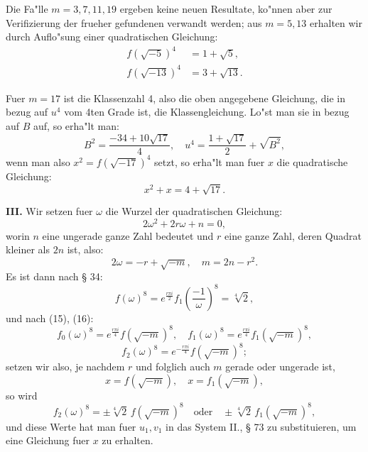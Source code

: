 \documentclass[12pt,a4paper]{article}
\theoremstyle{plain}
\theoremstyle{definition}
\theoremstyle{remark}
\begin{document}
Die Fa"lle $m = 3, 7, 11, 19$ ergeben keine neuen Resultate, ko"nnen aber zur Verifizierung der frueher gefundenen verwandt werden; aus $m = 5, 13$ erhalten wir durch Auflo"sung einer quadratischen Gleichung:
\begin{align}
f(\sqrt{-5})^4 &= 1 + \sqrt{5}, \label{eq:130_12}\\
f(\sqrt{-13})^4 &= 3 + \sqrt{13}. \label{eq:130_13}
\end{align}

Fuer $m = 17$ ist die Klassenzahl 4, also die oben angegebene Gleichung, die in bezug auf $u^4$ vom 4ten Grade ist, die Klassengleichung. Lo"st man sie in bezug auf $B$ auf, so erha"lt man:
\[
B^2 = \frac{-34 + 10\sqrt{17}}{4}, \quad u^4 = \frac{1 + \sqrt{17}}{2} + \sqrt{B^2},
\]
wenn man also $x^2 = f(\sqrt{-17})^4$ setzt, so erha"lt man fuer $x$ die quadratische Gleichung:
\begin{equation}\label{eq:130_14}
x^2 + x = 4 + \sqrt{17}.
\end{equation}

\textbf{III.} Wir setzen fuer $\omega$ die Wurzel der quadratischen Gleichung:
\begin{equation}\label{eq:130_15}
2\omega^2 + 2r\omega + n = 0,
\end{equation}
worin $n$ eine ungerade ganze Zahl bedeutet und $r$ eine ganze Zahl, deren Quadrat kleiner als $2n$ ist, also:
\begin{equation}\label{eq:130_16}
2\omega = -r + \sqrt{-m}, \quad m = 2n - r^2.
\end{equation}
Es ist dann nach \S{} 34:
\begin{equation}\label{eq:130_17}
f(\omega)^8 = e^{\frac{r\pi i}{2}} f_1\left(\frac{-1}{\omega}\right)^8 = \sqrt[4]{2},
\end{equation}
und nach (15), (16):
\begin{equation}\label{eq:130_18}
f_0(\omega)^8 = e^{\frac{r\pi i}{4}} f(\sqrt{-m})^8, \quad f_1(\omega)^8 = e^{\frac{r\pi i}{4}} f_1(\sqrt{-m})^8,
\end{equation}
\[
f_2(\omega)^8 = e^{-\frac{r\pi i}{4}} f(\sqrt{-m})^8;
\]
setzen wir also, je nachdem $r$ und folglich auch $m$ gerade oder ungerade ist,
\begin{equation}\label{eq:130_20}
x = f(\sqrt{-m}), \quad x = f_1(\sqrt{-m}),
\end{equation}
so wird
\begin{equation}\label{eq:130_21}
f_2(\omega)^8 = \pm \sqrt[4]{2}\, f(\sqrt{-m})^8 \quad \text{oder} \quad \pm \sqrt[4]{2}\, f_1(\sqrt{-m})^8,
\end{equation}
und diese Werte hat man fuer $u_1, v_1$ in das System II., \S{} 73 zu substituieren, um eine Gleichung fuer $x$ zu erhalten.
\end{document}
